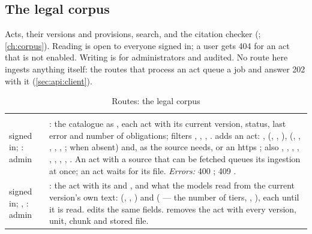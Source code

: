 \subsection{The legal corpus}\label{sec:api:corpus}

Acts, their versions and provisions, search, and the citation checker
(; \cref{ch:corpus}). Reading is open to everyone signed in; a user
gets 404 for an act that is not enabled. Writing is for administrators and audited. No route
here ingests anything itself: the routes that process an act queue a job and answer 202 with
it (\cref{sec:api:client}).

\begin{xltabular}{\textwidth}{@{}L{19mm}Y@{}}
\caption{Routes: the legal corpus}\label{tab:api:corpus}\\
\toprule {} &  \\ \midrule \endfirsthead
\toprule {} &  \\ \midrule \endhead
\bottomrule \endlastfoot
{}
signed in; : admin & : the catalogue as , each act with its
  current version, status, last error and number of obligations; filters ,
  , , .  adds an act: ,
   (, , ),  (,
  , , , , ;  when absent)
  and, as the source needs,  or an https ; also , ,
  , , , ,
  , , . An act with a source that can be
  fetched queues its ingestion at once; an  act waits for its file.
  \emph{Errors:} 400 ; 409 . \\
\addlinespace
{}
signed in; , : admin & : the act with its 
  and , and what the models read from the current version's own text:
   (, , ) and
   ( --- the number of tiers, , ), each
   until it is read.  edits the same fields.  removes the act with
  every version, unit, chunk and stored file. \\

\end{xltabular}
